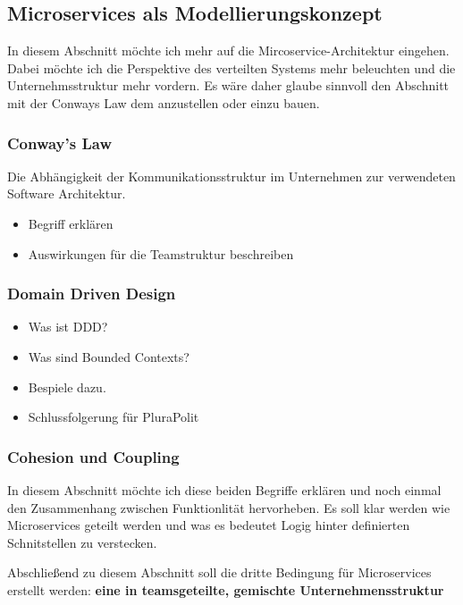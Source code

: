 \subsection{Microservices als Modellierungskonzept}

In diesem Abschnitt möchte ich mehr auf die Mircoservice-Architektur eingehen. Dabei möchte ich die Perspektive des verteilten Systems mehr beleuchten und die Unternehmsstruktur mehr vordern. Es wäre daher glaube sinnvoll den Abschnitt mit der Conways Law dem anzustellen oder einzu bauen.

\subsubsection{Conway's Law}

Die Abhängigkeit der Kommunikationsstruktur im Unternehmen zur verwendeten Software Architektur.

\begin{itemize}
	\item Begriff erklären
	\item Auswirkungen für die Teamstruktur beschreiben
\end{itemize}

\subsubsection{Domain Driven Design}

\begin{itemize}
	\item Was ist DDD?
	\item Was sind Bounded Contexts?
	\item 	Bespiele dazu.
	\item Schlussfolgerung für PluraPolit
\end{itemize}

\subsubsection{Cohesion und Coupling}

In diesem Abschnitt möchte ich diese beiden Begriffe erklären und noch einmal den Zusammenhang zwischen Funktionlität hervorheben. Es soll klar werden wie Microservices geteilt werden und was es bedeutet Logig hinter definierten Schnitstellen zu verstecken.

Abschließend zu diesem Abschnitt soll die dritte Bedingung für Microservices erstellt werden: \textbf{eine in teamsgeteilte, gemischte Unternehmensstruktur}
